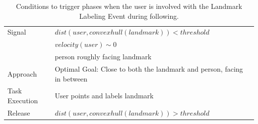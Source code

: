 \documentclass[12pt]{gatech-thesis}
\begin{document}
\begin{table}[ht!]
	\centering
  \begin{tabular}{l |  m{10cm}}    
    \toprule    
    Signal & {$dist(user, convex hull(landmark))<threshold$}\\       
	                           & {$velocity(user)\sim 0$} \\
	                           & {person roughly facing landmark}\\ \midrule		                           		                                
    Approach & {Optimal Goal: Close to both the landmark and person, facing in between}\\       \midrule
    Task Execution & {User points and labels landmark}\\  \midrule
    Release & {$dist(user, convex hull(landmark))>threshold$}\\ 
    \bottomrule
  \end{tabular}
      \caption{Conditions to trigger phases when the user is involved with the Landmark Labeling Event during following.}
    \label{table:situation_aware_list_landmark}
\end{table}
\end{document}

